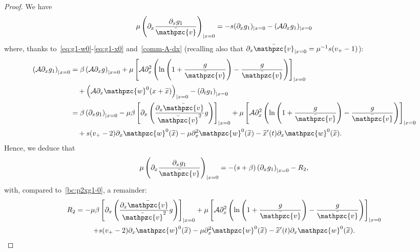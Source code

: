 \documentclass[AHL,Unicode,longabstracts,published]{cedram}
\newcommand{\bv}{\bar{\mathpzc{v}}}
\newcommand{\cA}{\mathcal A}
\newcommand{\tw}{\mathpzc{w}}
\newcommand{\tx}{\widetilde{x}}
\newcommand{\tx}{\widetilde{x}}
\begin{document}
\begin{proof}
We have
\[
\mu \left(\partial_x\dfrac{\partial_x g_1}{\bv}\right)_{|x=0} = -s (\partial_x g_1)_{|x=0} - (\cA \partial_x g_1)_{|x=0}
\]
where, thanks to~\eqref{eq:g1-w0}-\eqref{eq:g1-x0} and~\eqref{comm-A-dx} (recalling also that $\partial_x \bv_{|x=0} = \mu^{-1}s(v_+-1)$):
\begin{align*}
\left(\cA \partial_x g_1\right)_{|x=0} & =
\beta \left(\cA \partial_x g\right)_{|x=0} + \mu \left[\cA \partial^2_x \left(\ln \left(1+ \frac{g}{\bv}\right) - \frac{g}{\bv} \right) \right]_{|x=0} \\
& \quad + \left(\cA \partial_x \tw^0(x+\tx)\right)_{|x=0} - \left(\partial_t g_1\right)_{|x=0} \\
& = \beta \left(\partial_x g_1\right)_{|x=0} - \mu \beta \left[\partial_x \left(\dfrac{\partial_x \bv}{\bv^2} g\right)\right]_{|x=0} + \mu \left[\cA \partial^2_x \left(\ln \left(1+ \frac{g}{\bv}\right) - \frac{g}{\bv} \right) \right]_{|x=0} \\
& \quad + s (v_+-2) \partial_x \tw^0(\tx) - \mu \partial^2_x \tw^0(\tx) - \tx'(t) \partial_x \tw^0(\tx).
\end{align*}
Hence, we deduce that
\begin{equation}\label{bc:p2xg1-w0}
\mu \left(\partial_x\dfrac{\partial_x g_1}{\bv}\right)_{|x=0} = -(s+\beta) \left(\partial_x g_1\right)_{|x=0} - R_2,
\end{equation}
with, compared to~\eqref{bc:p2xg1-0}, a remainder:
\begin{multline*}
R_2  = -\mu \beta \left[\partial_x \left(\dfrac{\partial_x \bv}{\bv^2} g\right)\right]_{|x=0} + \mu \left[\cA \partial^2_x \left(\ln \left(1+ \frac{g}{\bv}\right) - \frac{g}{\bv} \right) \right]_{|x=0} \\
 + s (v_+-2) \partial_x \tw^0(\tx) - \mu \partial^2_x \tw^0(\tx) - \tx'(t) \partial_x \tw^0(\tx).
\end{multline*}


\end{proof}
\end{document}
